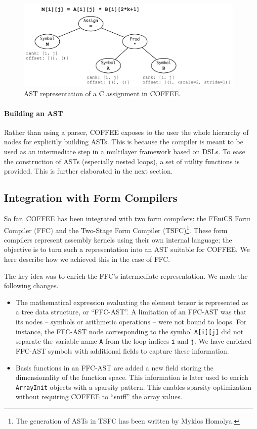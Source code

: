 \begin{figure}
\begin{center}
\includegraphics[scale=0.70]{coffee/pictures/coffee-ast.pdf}
\caption{AST representation of a C assignment in COFFEE.}
\label{fig:coffee-ast-vs-c}
\end{center}
\end{figure}

\paragraph{Building an AST}
Rather than using a parser, COFFEE exposes to the user the whole hierarchy of nodes for explicitly building ASTs. This is because the compiler is meant to be used as an intermediate step in a multilayer framework based on DSLs. To ease the construction of ASTs (especially nested loops), a set of utility functions is provided. This is further elaborated in the next section.

\subsection{Integration with Form Compilers}
So far, COFFEE has been integrated with two form compilers: the FEniCS Form Compiler (FFC) and the Two-Stage Form Compiler (TSFC)\footnote{The generation of ASTs in TSFC has been written by Myklos Homolya.}. These form compilers represent assembly kernels using their own internal language; the objective is to turn such a representation into an AST suitable for COFFEE. We here describe how we achieved this in the case of FFC.

The key idea was to enrich the FFC's intermediate representation. We made the following changes.
\begin{itemize}
\item The mathematical expression evaluating the element tensor is represented as a tree data structure, or ``FFC-AST''. A limitation of an FFC-AST was that its nodes -- symbols or arithmetic operations -- were not bound to loops. For instance, the FFC-AST node corresponding to the symbol \texttt{A[i][j]} did not separate the variable name \texttt{A} from the loop indices \texttt{i} and \texttt{j}. We have enriched FFC-AST symbols with additional fields to capture these information.
\item Basis functions in an FFC-AST are added a new field storing the dimensionality of the function space. This information is later used to enrich \texttt{ArrayInit} objects with a sparsity pattern. This enables sparsity optimization without requiring COFFEE to ``sniff'' the array values.
\end{itemize}

